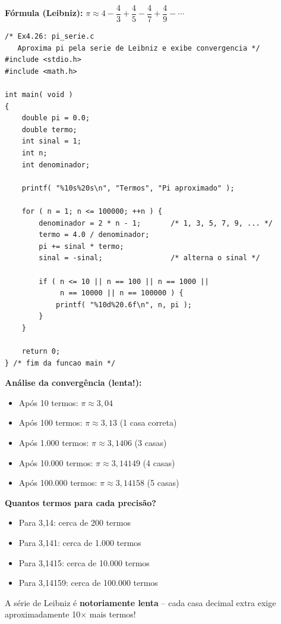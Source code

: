 \documentclass[12pt,a4paper]{article}
\begin{document}
\begin{respostabox}
\textbf{Fórmula (Leibniz):}
$\pi \approx 4 - \dfrac{4}{3} + \dfrac{4}{5} - \dfrac{4}{7} + \dfrac{4}{9} - \cdots$

\begin{lstlisting}
/* Ex4.26: pi_serie.c
   Aproxima pi pela serie de Leibniz e exibe convergencia */
#include <stdio.h>
#include <math.h>

int main( void )
{
    double pi = 0.0;
    double termo;
    int sinal = 1;
    int n;
    int denominador;

    printf( "%10s%20s\n", "Termos", "Pi aproximado" );

    for ( n = 1; n <= 100000; ++n ) {
        denominador = 2 * n - 1;       /* 1, 3, 5, 7, 9, ... */
        termo = 4.0 / denominador;
        pi += sinal * termo;
        sinal = -sinal;                /* alterna o sinal */

        if ( n <= 10 || n == 100 || n == 1000 ||
             n == 10000 || n == 100000 ) {
            printf( "%10d%20.6f\n", n, pi );
        }
    }

    return 0;
} /* fim da funcao main */
\end{lstlisting}

\textbf{Análise da convergência (lenta!):}
\begin{itemize}[noitemsep]
  \item Após 10 termos: $\pi \approx 3{,}04$
  \item Após 100 termos: $\pi \approx 3{,}13$ (1 casa correta)
  \item Após 1.000 termos: $\pi \approx 3{,}1406$ (3 casas)
  \item Após 10.000 termos: $\pi \approx 3{,}14149$ (4 casas)
  \item Após 100.000 termos: $\pi \approx 3{,}14158$ (5 casas)
\end{itemize}

\textbf{Quantos termos para cada precisão?}
\begin{itemize}[noitemsep]
  \item Para 3,14: cerca de 200 termos
  \item Para 3,141: cerca de 1.000 termos
  \item Para 3,1415: cerca de 10.000 termos
  \item Para 3,14159: cerca de 100.000 termos
\end{itemize}
A série de Leibniz é \textbf{notoriamente lenta} -- cada casa decimal extra exige
aproximadamente 10× mais termos!
\end{respostabox}
\end{document}
